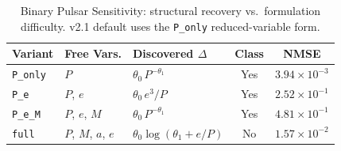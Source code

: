 \begin{table}[t]
\centering\footnotesize
\caption{Binary Pulsar Sensitivity: structural recovery vs.\ formulation difficulty. v2.1 default uses the \texttt{P\_only} reduced-variable form.}
\label{tab:pulsar_sensitivity}
\begin{tabularx}{\textwidth}{L l L c c}
\toprule
\textbf{Variant} & \textbf{Free Vars.} & \textbf{Discovered $\Delta$} & \textbf{Class} & \textbf{NMSE} \\
\midrule
\texttt{P\_only} & $P$ & $\theta_{0}\, P^{-\theta_{1}}$ & Yes & $3.94 \times 10^{-3}$ \\
\texttt{P\_e} & $P$, $e$ & $\theta_{0}\, e^{3}/P$ & Yes & $2.52 \times 10^{-1}$ \\
\texttt{P\_e\_M} & $P$, $e$, $M$ & $\theta_{0}\, P^{-\theta_{1}}$ & Yes & $4.81 \times 10^{-1}$ \\
\texttt{full} & $P$, $M$, $a$, $e$ & $\theta_{0}\log(\theta_{1}+e/P)$ & No & $1.57 \times 10^{-2}$ \\
\bottomrule
\end{tabularx}
\end{table}